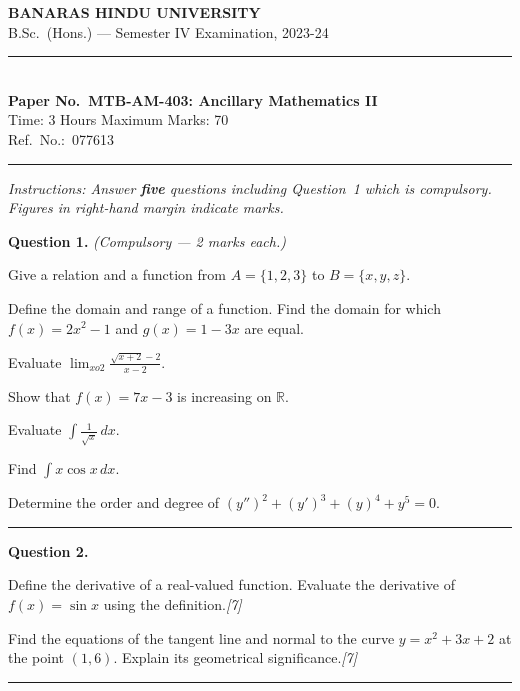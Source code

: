 \documentclass[11pt,a4paper]{article}
\newcommand{\pts}[1]{\hfill   \textit{[#1]}}
\begin{document}
\begin{center}
  {\large\bfseries BANARAS HINDU UNIVERSITY}\\[2pt]
  {\normalsize B.Sc.\ (Hons.) --- Semester IV Examination, 2023-24}\\[6pt]
  \rule{0.8\linewidth}{0.5pt}\\[6pt]
  {\large\bfseries Paper No.\ MTB-AM-403: Ancillary Mathematics II}\\[4pt]
  {\normalsize Time: 3 Hours \hfill Maximum Marks: 70}\\[2pt]
  {\small Ref.\ No.:\ 077613}
\end{center}
\rule{\linewidth}{0.4pt}
\smallskip



\noindent   \textit{Instructions: Answer   \textbf{five} questions including Question~1 which is compulsory. Figures in right-hand margin indicate marks.}
\bigskip




\noindent   \textbf{Question 1.}   \textit{(Compulsory --- 2 marks each.)}

\begin{parts}
  \item Give a relation and a function from $A=\{1,2,3\}$ to $B=\{x,y,z\}$.
  \item Define the domain and range of a function. Find the domain for which $f(x)=2x^2-1$ and $g(x)=1-3x$ are equal.
  \item Evaluate $\displaystyle\lim_{x o2}\frac{\sqrt{x+2}-2}{x-2}$.
  \item Show that $f(x)=7x-3$ is increasing on $\mathbb{R}$.
  \item Evaluate $\displaystyle\int \frac{1}{\sqrt{x}}\,dx$.
  \item Find $\displaystyle\int x\cos x\,dx$.
  \item Determine the order and degree of $(y'')^2+(y')^3+(y)^4+y^5=0$.
\end{parts}
\medskip\rule{\linewidth}{0.2pt}

\medskip


\noindent   \textbf{Question 2.}

\begin{parts}
  \item Define the derivative of a real-valued function. Evaluate the derivative of $f(x)=\sin x$ using the definition.\pts{7}
  \item Find the equations of the tangent line and normal to the curve $y=x^2+3x+2$ at the point $(1,6)$. Explain its geometrical significance.\pts{7}
\end{parts}
\medskip\rule{\linewidth}{0.2pt}
\end{document}
